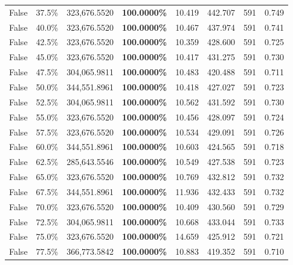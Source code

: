 \begin{table}[H]
\begin{tabular}{lllrllll}
\cline{1-8}
False & 37.5\% & 323,676.5520 & \bfseries \color{red} 100.0000\% & 10.419 & 442.707 & 591 & 0.749 \\
\cline{1-8}
False & 40.0\% & 323,676.5520 & \bfseries \color{red} 100.0000\% & 10.467 & 437.974 & 591 & 0.741 \\
\cline{1-8}
False & 42.5\% & 323,676.5520 & \bfseries \color{red} 100.0000\% & 10.359 & 428.600 & 591 & 0.725 \\
\cline{1-8}
False & 45.0\% & 323,676.5520 & \bfseries \color{red} 100.0000\% & 10.417 & 431.275 & 591 & 0.730 \\
\cline{1-8}
False & 47.5\% & 304,065.9811 & \bfseries \color{red} 100.0000\% & 10.483 & 420.488 & 591 & 0.711 \\
\cline{1-8}
False & 50.0\% & 344,551.8961 & \bfseries \color{red} 100.0000\% & 10.418 & 427.027 & 591 & 0.723 \\
\cline{1-8}
False & 52.5\% & 304,065.9811 & \bfseries \color{red} 100.0000\% & 10.562 & 431.592 & 591 & 0.730 \\
\cline{1-8}
False & 55.0\% & 323,676.5520 & \bfseries \color{red} 100.0000\% & 10.456 & 428.097 & 591 & 0.724 \\
\cline{1-8}
False & 57.5\% & 323,676.5520 & \bfseries \color{red} 100.0000\% & 10.534 & 429.091 & 591 & 0.726 \\
\cline{1-8}
False & 60.0\% & 344,551.8961 & \bfseries \color{red} 100.0000\% & 10.603 & 424.565 & 591 & 0.718 \\
\cline{1-8}
False & 62.5\% & \color{red} 285,643.5546 & \bfseries \color{red} 100.0000\% & 10.549 & 427.538 & 591 & 0.723 \\
\cline{1-8}
False & 65.0\% & 323,676.5520 & \bfseries \color{red} 100.0000\% & 10.769 & 432.812 & 591 & 0.732 \\
\cline{1-8}
False & 67.5\% & 344,551.8961 & \bfseries \color{red} 100.0000\% & 11.936 & 432.433 & 591 & 0.732 \\
\cline{1-8}
False & 70.0\% & 323,676.5520 & \bfseries \color{red} 100.0000\% & 10.409 & 430.560 & 591 & 0.729 \\
\cline{1-8}
False & 72.5\% & 304,065.9811 & \bfseries \color{red} 100.0000\% & 10.668 & 433.044 & 591 & 0.733 \\
\cline{1-8}
False & 75.0\% & 323,676.5520 & \bfseries \color{red} 100.0000\% & 14.659 & 425.912 & 591 & 0.721 \\
\cline{1-8}
False & 77.5\% & 366,773.5842 & \bfseries \color{red} 100.0000\% & 10.883 & 419.352 & 591 & 0.710 \\

\end{tabular}
\end{table}
